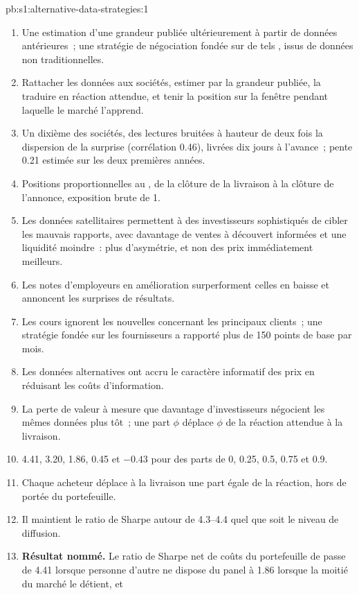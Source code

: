 \begin{solution}{pb:s1:alternative-data-strategies:1}
\begin{enumerate}
\item Une estimation d'une grandeur publiée ultérieurement à partir de données antérieures~; une stratégie de négociation fondée sur de tels , issus de données non traditionnelles.
\item Rattacher les données aux sociétés, estimer par  la grandeur publiée, la traduire en réaction attendue, et tenir la position sur la fenêtre pendant laquelle le marché l'apprend.
\item Un dixième des sociétés, des lectures bruitées à hauteur de deux fois la dispersion de la surprise (corrélation 0.46), livrées dix jours à l'avance~; pente 0.21 estimée sur les deux premières
années.
\item Positions proportionnelles au , de la clôture de la livraison à la clôture de l'annonce, exposition brute de 1.
\item Les données satellitaires permettent à des investisseurs sophistiqués de cibler les mauvais rapports, avec davantage de ventes à découvert informées et une liquidité moindre~: plus d'asymétrie, et non
des prix immédiatement meilleurs.
\item Les notes d'employeurs en amélioration surperforment celles en baisse et annoncent les surprises de résultats.
\item Les cours ignorent les nouvelles concernant les principaux clients~; une stratégie fondée sur les fournisseurs a rapporté plus de 150 points de base par mois.
\item Les données alternatives ont accru le caractère informatif des prix en réduisant les coûts d'information.
\item La perte de valeur à mesure que davantage d'investisseurs négocient les mêmes données plus tôt~; une part $\phi$ déplace $\phi$ de la réaction attendue à la livraison.
\item 4.41, 3.20, 1.86, 0.45 et $-0.43$ pour des parts de 0, 0.25, 0.5, 0.75 et 0.9.
\item Chaque acheteur déplace à la livraison une part égale de la réaction, hors de portée du portefeuille.
\item Il maintient le ratio de Sharpe autour de 4.3--4.4 quel que soit le niveau de diffusion.
\item \textbf{Résultat nommé.} Le ratio de Sharpe net de coûts du portefeuille de  passe de 4.41 lorsque personne d'autre ne dispose du panel à 1.86 lorsque la moitié du marché le détient, et

\end{enumerate}
\end{solution}
